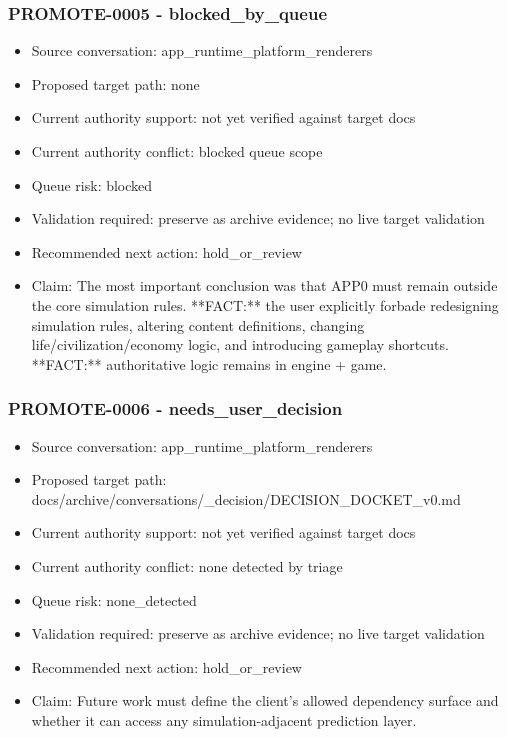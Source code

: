 \documentclass[11pt,a4paper]{report}
\begin{document}
\subsubsection{PROMOTE-0005 - blocked\_by\_queue}

\begin{itemize}
\item Source conversation: app\_runtime\_platform\_renderers
\item Proposed target path: none
\item Current authority support: not yet verified against target docs
\item Current authority conflict: blocked queue scope
\item Queue risk: blocked
\item Validation required: preserve as archive evidence; no live target validation
\item Recommended next action: hold\_or\_review
\item Claim: The most important conclusion was that APP0 must remain outside the core simulation rules. **FACT:** the user explicitly forbade redesigning simulation rules, altering content definitions, changing life/civilization/economy logic, and introducing gameplay shortcuts. **FACT:** authoritative logic remains in engine + game.
\end{itemize}

\subsubsection{PROMOTE-0006 - needs\_user\_decision}

\begin{itemize}
\item Source conversation: app\_runtime\_platform\_renderers
\item Proposed target path: docs/archive/conversations/\_decision/DECISION\_DOCKET\_v0.md
\item Current authority support: not yet verified against target docs
\item Current authority conflict: none detected by triage
\item Queue risk: none\_detected
\item Validation required: preserve as archive evidence; no live target validation
\item Recommended next action: hold\_or\_review
\item Claim: Future work must define the client's allowed dependency surface and whether it can access any simulation-adjacent prediction layer.
\end{itemize}
\end{document}
